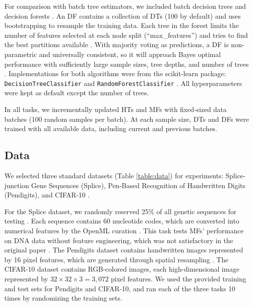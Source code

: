 For comparison with batch tree estimators, we included batch decision trees and decision forests \citep{breiman_random_2001}. An DF contains a collection of DTs (100 by default) and uses bootstrapping to resample the training data. Each tree in the forest limits the number of features selected at each node split (``max\_features'') and tries to find the best partitions available \citep{breiman_random_2001}.
With majority voting as predictions, a DF is non-parametric and universally consistent, so it will approach Bayes optimal performance with sufficiently large sample sizes, tree depths, and number of trees \citep{liaw_classification_2002, biau_consistency_2008}.
Implementations for both algorithms were from the scikit-learn package: \texttt{DecisionTreeClassifier} and \texttt{RandomForestClassifier} \citep{pedregosa_scikit-learn_2011}. All hyperparameters were kept as default except the number of trees.

In all tasks, we incrementally updated HTs and MFs with fixed-sized data batches (100 random samples per batch). At each sample size, DTs and DFs were trained with all available data, including current and previous batches. 

\subsection{Data}
We selected three standard datasets (Table \ref{table:data}) for experiments: Splice-junction Gene Sequences (Splice), Pen-Based Recognition of Handwritten Digits (Pendigits), and CIFAR-10 \citep{towell_molecular_1991, alpaydin_pen-based_1998, krizhevsky_learning_2012, lavanya_handwritten_2017}.

For the Splice dataset, we randomly reserved 25\% of all genetic sequences for testing \citep{rampone_splice-junction_1998, sarkar_splice_2020}. Each sequence contains 60 nucleotide codes, which are converted into numerical features by the OpenML curation \citep{feurer_openml-python_2019}. This task tests MFs' performance on DNA data without feature engineering, which was not satisfactory in the original paper \cite{lakshminarayanan_mondrian_2014}. 
The Pendigits dataset contains handwritten images represented by 16 pixel features, which are generated through spatial resampling \citep{alimoglu_methods_1996}.
The CIFAR-10 dataset contains RGB-colored images, each high-dimensional image represented by $32 \times 32 \times 3 = 3,072$ pixel features. We used the provided training and test sets for Pendigits and CIFAR-10, and ran each of the three tasks 10 times by randomizing the training sets. 


